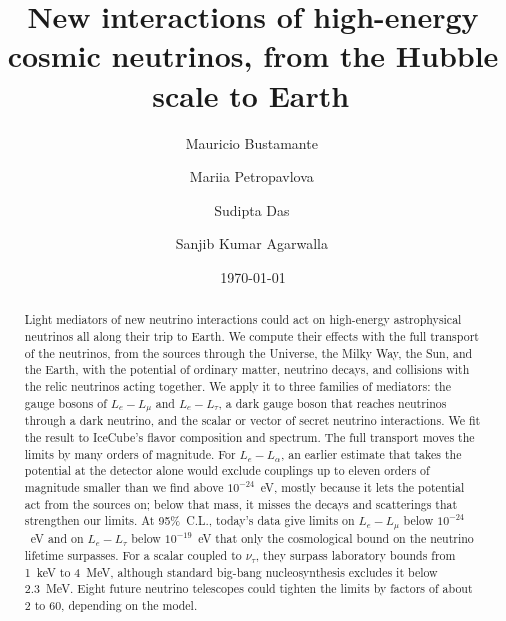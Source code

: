 \documentclass[linenumbers, aps, prd, twocolumn, superscriptaddress, floatfix, longbibliography, nofootinbib, bibnotes]{revtex4-2}
\newcommand{\repourl}{https://github.com/mbustama/nu-new-interactions-cosmic}
\begin{document}
\title{New interactions of high-energy cosmic neutrinos, from the Hubble scale to Earth\,\href{\repourl}{\faGithub}}

\author{Mauricio Bustamante\,}

\author{Mariia Petropavlova\,}

\author{Sudipta Das\,}

\author{Sanjib Kumar Agarwalla\,}

\date{\today}

\begin{abstract}
Light mediators of new neutrino interactions could act on high-energy astrophysical neutrinos all along their trip to Earth.
We compute their effects with the full transport of the neutrinos, from the sources through the Universe, the Milky Way, the Sun, and the Earth, with the potential of ordinary matter, neutrino decays, and collisions with the relic neutrinos acting together.
We apply it to three families of mediators: the gauge bosons of $L_e - L_\mu$ and $L_e - L_\tau$, a dark gauge boson that reaches neutrinos through a dark neutrino, and the scalar or vector of secret neutrino interactions.
We fit the result to IceCube's flavor composition and spectrum.
The full transport moves the limits by many orders of magnitude.
For $L_e - L_\alpha$, an earlier estimate that takes the potential at the detector alone would exclude couplings up to eleven orders of magnitude smaller than we find above $10^{-24}$~eV, mostly because it lets the potential act from the sources on; below that mass, it misses the decays and scatterings that strengthen our limits.
At 95\%~C.L., today's data give limits on $L_e - L_\mu$ below $10^{-24}$~eV and on $L_e - L_\tau$ below $10^{-19}$~eV that only the cosmological bound on the neutrino lifetime surpasses.
For a scalar coupled to $\nu_\tau$, they surpass laboratory bounds from 1~keV to 4~MeV, although standard big-bang nucleosynthesis excludes it below 2.3~MeV.
Eight future neutrino telescopes could tighten the limits by factors of about 2 to 60, depending on the model.
\end{abstract}
\end{document}
